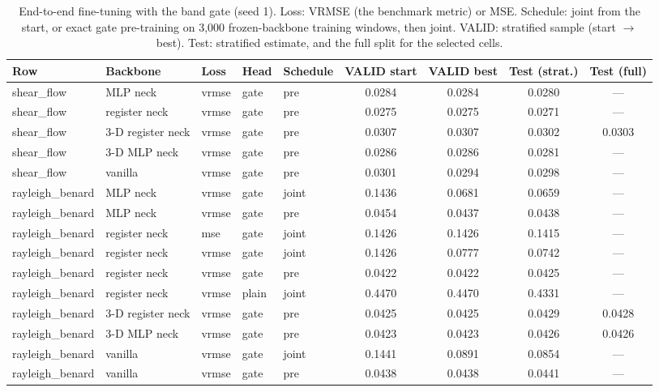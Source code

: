 \documentclass{article}
\begin{document}
\begin{table}[h]
\centering
\caption{End-to-end fine-tuning with the band gate (seed 1). Loss: VRMSE (the benchmark metric) or MSE. Schedule:
joint from the start, or exact gate pre-training on 3{,}000 frozen-backbone training windows, then joint. VALID:
stratified sample (start $\to$ best). Test: stratified estimate, and the full split for the selected cells.}
\label{tab:ft}
\scriptsize
\setlength{\tabcolsep}{3pt}
\begin{tabular}{lllllcccc}
\toprule
Row & Backbone & Loss & Head & Schedule & VALID start & VALID best & Test (strat.) & Test (full) \\
\midrule
shear\_flow & MLP neck & vrmse & gate & pre & 0.0284 & 0.0284 & 0.0280 & --- \\
shear\_flow & register neck & vrmse & gate & pre & 0.0275 & 0.0275 & 0.0271 & --- \\
shear\_flow & 3-D register neck & vrmse & gate & pre & 0.0307 & 0.0307 & 0.0302 & 0.0303 \\
shear\_flow & 3-D MLP neck & vrmse & gate & pre & 0.0286 & 0.0286 & 0.0281 & --- \\
shear\_flow & vanilla & vrmse & gate & pre & 0.0301 & 0.0294 & 0.0298 & --- \\
rayleigh\_benard & MLP neck & vrmse & gate & joint & 0.1436 & 0.0681 & 0.0659 & --- \\
rayleigh\_benard & MLP neck & vrmse & gate & pre & 0.0454 & 0.0437 & 0.0438 & --- \\
rayleigh\_benard & register neck & mse & gate & joint & 0.1426 & 0.1426 & 0.1415 & --- \\
rayleigh\_benard & register neck & vrmse & gate & joint & 0.1426 & 0.0777 & 0.0742 & --- \\
rayleigh\_benard & register neck & vrmse & gate & pre & 0.0422 & 0.0422 & 0.0425 & --- \\
rayleigh\_benard & register neck & vrmse & plain & joint & 0.4470 & 0.4470 & 0.4331 & --- \\
rayleigh\_benard & 3-D register neck & vrmse & gate & pre & 0.0425 & 0.0425 & 0.0429 & 0.0428 \\
rayleigh\_benard & 3-D MLP neck & vrmse & gate & pre & 0.0423 & 0.0423 & 0.0426 & 0.0426 \\
rayleigh\_benard & vanilla & vrmse & gate & joint & 0.1441 & 0.0891 & 0.0854 & --- \\
rayleigh\_benard & vanilla & vrmse & gate & pre & 0.0438 & 0.0438 & 0.0441 & --- \\

\end{tabular}
\end{table}
\end{document}
